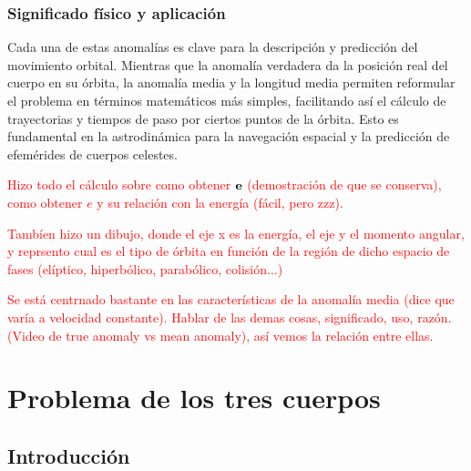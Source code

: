 \subsubsection{Significado f\'isico y aplicaci\'on}
Cada una de estas anomal\'ias es clave para la descripci\'on y predicci\'on del movimiento orbital. Mientras que la anomal\'ia verdadera da la posici\'on real del cuerpo en su \'orbita, la anomal\'ia media y la longitud media permiten reformular el problema en t\'erminos matem\'aticos m\'as simples, facilitando as\'i el c\'alculo de trayectorias y tiempos de paso por ciertos puntos de la órbita. Esto es fundamental en la astrodin\'amica para la navegaci\'on espacial y la predicci\'on de efem\'erides de cuerpos celestes.



\begin{Anotacion}
	\textcolor{red}{Hizo todo el cálculo sobre como obtener $\mathbf{e}$ (demostración de que se conserva), como obtener $e$ y su relación con la energía (fácil, pero zzz).}
\end{Anotacion}
\begin{Anotacion}
	\textcolor{red}{Tambíen hizo un dibujo, donde el eje x es la energía, el eje y el momento angular, y reprsento cual es el tipo de órbita en función de la región de dicho espacio de fases (elíptico, hiperbólico, parabólico, colisión...)}
\end{Anotacion}
\begin{Anotacion}
	\textcolor{red}{ Se está centrnado bastante en las características de la anomalía media (dice que varía a velocidad constante). Hablar de las demas cosas, significado, uso, razón. (Video de true anomaly vs mean anomaly), así vemos la relación entre ellas. }
\end{Anotacion}


\section{Problema de los tres cuerpos}

\subsection{Introducción}

